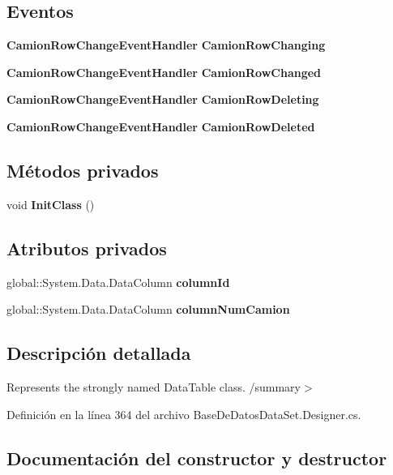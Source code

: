 \subsection*{Eventos}
\begin{DoxyCompactItemize}
\item 
{\bf Camion\-Row\-Change\-Event\-Handler} {\bf Camion\-Row\-Changing}
\item 
{\bf Camion\-Row\-Change\-Event\-Handler} {\bf Camion\-Row\-Changed}
\item 
{\bf Camion\-Row\-Change\-Event\-Handler} {\bf Camion\-Row\-Deleting}
\item 
{\bf Camion\-Row\-Change\-Event\-Handler} {\bf Camion\-Row\-Deleted}
\end{DoxyCompactItemize}
\subsection*{Métodos privados}
\begin{DoxyCompactItemize}
\item 
void {\bf Init\-Class} ()
\end{DoxyCompactItemize}
\subsection*{Atributos privados}
\begin{DoxyCompactItemize}
\item 
global\-::\-System.\-Data.\-Data\-Column {\bf column\-Id}
\item 
global\-::\-System.\-Data.\-Data\-Column {\bf column\-Num\-Camion}
\end{DoxyCompactItemize}


\subsection{Descripción detallada}
Represents the strongly named Data\-Table class. /summary$>$ 

Definición en la línea 364 del archivo Base\-De\-Datos\-Data\-Set.\-Designer.\-cs.



\subsection{Documentación del constructor y destructor}

